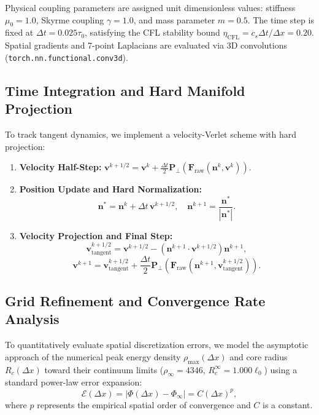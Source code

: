 \documentclass[11pt,a4paper]{article}
\begin{document}
	Physical coupling parameters are assigned unit dimensionless values: stiffness $\mu_0 = 1.0$, Skyrme coupling $\gamma = 1.0$, and mass parameter $m = 0.5$. The time step is fixed at $\Delta t = 0.025 \tau_0$, satisfying the CFL stability bound $\eta_{\text{CFL}} = c_s \Delta t / \Delta x = 0.20$. Spatial gradients and 7-point Laplacians are evaluated via 3D convolutions (\texttt{torch.nn.functional.conv3d}).
	
	\subsection{Time Integration and Hard Manifold Projection}
	To track tangent dynamics, we implement a velocity-Verlet scheme with hard projection:
	\begin{enumerate}
		\item \textbf{Velocity Half-Step:} $\mathbf{v}^{k+1/2} = \mathbf{v}^k + \frac{\Delta t}{2} \mathbf{P}_\perp(\mathbf{F}_{\text{raw}}(\mathbf{n}^k, \mathbf{v}^k))$.
		\item \textbf{Position Update and Hard Normalization:}
		\begin{equation}
			\mathbf{n}^* = \mathbf{n}^k + \Delta t \, \mathbf{v}^{k+1/2}, \quad \mathbf{n}^{k+1} = \frac{\mathbf{n}^*}{|\mathbf{n}^*|}.
			\label{eq:hard_norm}
		\end{equation}
		\item \textbf{Velocity Projection and Final Step:}
		\begin{equation}
			\mathbf{v}^{k+1/2}_{\text{tangent}} = \mathbf{v}^{k+1/2} - \left( \mathbf{n}^{k+1} \cdot \mathbf{v}^{k+1/2} \right) \mathbf{n}^{k+1},
		\end{equation}
		\begin{equation}
			\mathbf{v}^{k+1} = \mathbf{v}^{k+1/2}_{\text{tangent}} + \frac{\Delta t}{2} \mathbf{P}_\perp(\mathbf{F}_{\text{raw}}(\mathbf{n}^{k+1}, \mathbf{v}^{k+1/2}_{\text{tangent}})).
		\end{equation}
	\end{enumerate}
	
	\subsection{Grid Refinement and Convergence Rate Analysis}
	To quantitatively evaluate spatial discretization errors, we model the asymptotic approach of the numerical peak energy density $\rho_{\max}(\Delta x)$ and core radius $R_c(\Delta x)$ toward their continuum limits ($\rho_\infty = 4346$, $R_c^\infty = 1.000 \ell_0$) using a standard power-law error expansion:
	\begin{equation}
		\mathcal{E}(\Delta x) = |\Phi(\Delta x) - \Phi_\infty| = C (\Delta x)^p,
		\label{eq:convergence_rate}
	\end{equation}
	where $p$ represents the empirical spatial order of convergence and $C$ is a constant.
	
\end{document}
